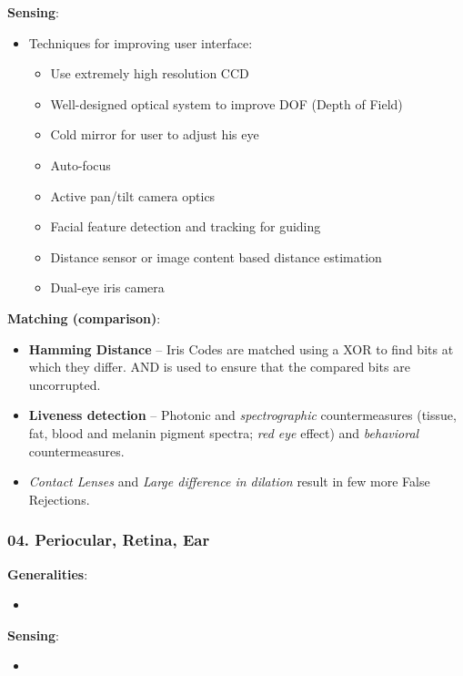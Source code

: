 \documentclass[a4paper]{article}
\begin{document}
      \textbf{Sensing}:
      \begin{itemize}
        \item Techniques for improving user interface:
        \begin{itemize}
          \item Use extremely high resolution CCD 
          \item Well-designed optical system to improve DOF (Depth of Field)
          \item Cold mirror for user to adjust his eye
          \item Auto-focus
          \item Active pan/tilt camera optics
          \item Facial feature detection and tracking for guiding
          \item Distance sensor or image content based distance estimation
          \item Dual-eye iris camera
        \end{itemize}
      \end{itemize}

      \textbf{Matching (comparison)}:
      \begin{itemize}
        \item \textbf{Hamming Distance} -- Iris Codes are matched using a XOR to find bits at which they differ. AND is used to ensure that the compared bits are uncorrupted.
        \item \textbf{Liveness detection} -- Photonic and \emph{spectrographic} countermeasures (tissue, fat, blood and melanin pigment spectra; \emph{red eye} effect) and \emph{behavioral} countermeasures.
        \item \emph{Contact Lenses} and \emph{Large difference in dilation} result in few more False Rejections.
      \end{itemize}
    \newpage
    \subsubsection*{04. Periocular, Retina, Ear}
      \textbf{Generalities}:
      \begin{itemize}
        \item 
      \end{itemize}

      \textbf{Sensing}:
      \begin{itemize}
        \item 
      \end{itemize}
\end{document}
